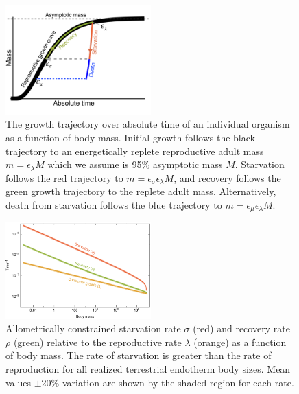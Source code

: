 \documentclass{pnastwo}
\begin{document}
\begin{figure}
\centering
\includegraphics[width=0.5\textwidth]{Growth-trajectory-diagram.pdf}
\caption{ The growth trajectory over absolute time of an individual organism
  as a function of body mass.  Initial growth follows the black trajectory to
  an energetically replete reproductive adult mass $m=\epsilon_\lambda M$ which we assume is 95\% asymptotic mass $M$.  Starvation follows the red
  trajectory to $m = \epsilon_\sigma \epsilon_\lambda  M$, and recovery follows the
  green growth trajectory to the replete adult mass. Alternatively, death from starvation follows the blue trajectory to $m=\epsilon_\mu \epsilon_\lambda  M$.}
\label{fig:growth}
\end{figure}

\begin{figure}
\centering
\includegraphics[width=0.5\textwidth]{fig_Rates.pdf}
\caption{
Allometrically constrained starvation rate $\sigma$ (red) and recovery rate $\rho$ (green) relative to the reproductive rate $\lambda$ (orange) as a function of body mass.
The rate of starvation is greater than the rate of reproduction for all realized terrestrial endotherm body sizes.
Mean values $\pm 20\%$ variation are shown by the shaded region for each rate.
}
\label{fig:gvs}
\end{figure}
\end{document}
